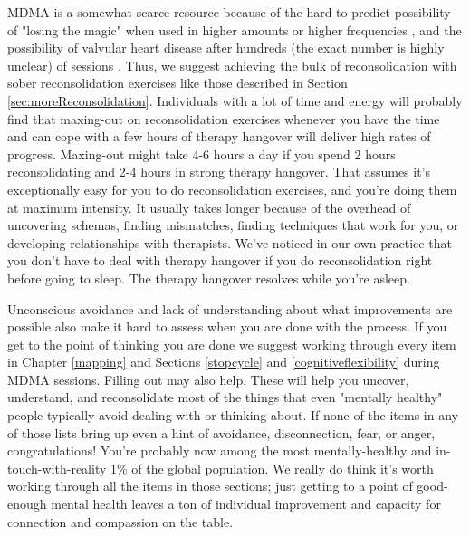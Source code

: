 \documentclass[12pt,letterpaper]{book}
\begin{document}
MDMA is a somewhat scarce resource because of the hard-to-predict possibility of "losing the magic" when used in higher amounts or higher frequencies \cite{farreTolerance,parrottTolerance}, and the possibility of valvular heart disease after hundreds (the exact number is highly unclear) of sessions \cite{droogmans2007valvular}. Thus, we suggest achieving the bulk of reconsolidation with sober reconsolidation exercises like those described in Section \ref{sec:moreReconsolidation}. Individuals with a lot of time and energy will probably find that maxing-out on reconsolidation exercises whenever you have the time and can cope with a few hours of therapy hangover will deliver high rates of progress. Maxing-out might take 4-6 hours a day if you spend 2 hours reconsolidating and 2-4 hours in strong therapy hangover. That assumes it's exceptionally easy for you to do reconsolidation exercises, and you're doing them at maximum intensity. It usually takes longer because of the overhead of uncovering schemas, finding mismatches, finding techniques that work for you, or developing relationships with therapists. We've noticed in our own practice that you don't have to deal with therapy hangover if you do reconsolidation right before going to sleep. The therapy hangover resolves while you're asleep.

Unconscious avoidance and lack of understanding about what improvements are possible also make it hard to assess when you are done with the process. If you get to the point of thinking you are done we suggest working through every item in Chapter \ref{mapping} and Sections \ref{stopcycle} and \ref{cognitiveflexibility} during MDMA sessions. Filling out \textcite{maladaptiveSchemaScale} may also help. These will help you uncover, understand, and reconsolidate most of the things that even "mentally healthy" people typically avoid dealing with or thinking about. If none of the items in any of those lists bring up even a hint of avoidance, disconnection, fear, or anger, congratulations! You're probably now among the most mentally-healthy and in-touch-with-reality 1\% of the global population. We really do think it's worth working through all the items in those sections; just getting to a point of good-enough mental health leaves a ton of individual improvement and capacity for connection and compassion on the table.
\end{document}
